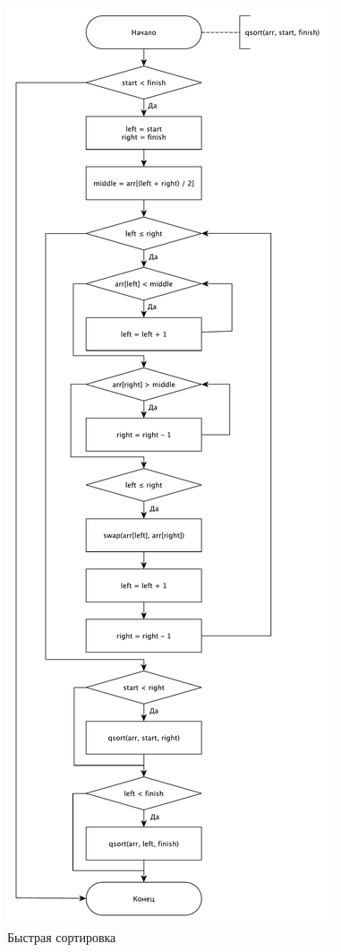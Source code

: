 \documentclass[a4paper,12pt]{article}
\begin{document}
\begin{figure}[H]
    \centering
    \includegraphics[scale=0.45]{QSort}
    \caption{Быстрая сортировка}
    \label{img:qsort}
\end{figure}
\end{document}
